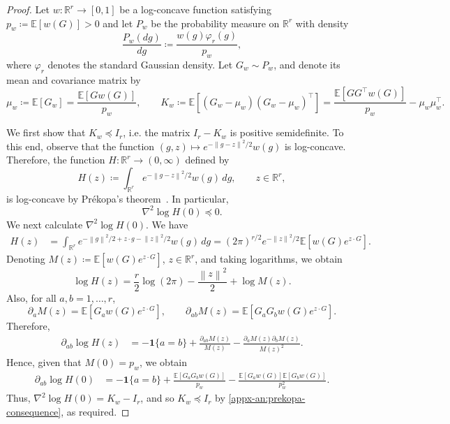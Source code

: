 \documentclass[11pt,letterpaper]{article}
\theoremstyle{remark}
\newcommand{\E}{\mathbb E}
\newcommand{\R}{\mathbb R}
\newcommand{\norm}[1]{\left\lVert#1\right\rVert}
\newcommand{\dd}{\,d}
\begin{document}
\begin{proof}

Let \(w:\R^r\to[0,1]\) be a log-concave function
satisfying \(p_w\coloneqq\E[w(G)]>0\) and let
\(P_w\) be the probability measure on \(\R^r\) with density
\[
\frac{P_w(dg)}{dg}
\coloneqq\frac{w(g)\varphi_r(g)}{p_w},
\]
where \(\varphi_r\) denotes the standard Gaussian density.
Let \(G_w\sim P_w\), and denote its mean and covariance
matrix by
\[
\mu_w\coloneqq\E[G_w]=\frac{\E[Gw(G)]}{p_w},\qquad
K_w\coloneqq\E[(G_w-\mu_w)(G_w-\mu_w)^\top]=\frac{\E[GG^\top w(G)]}{p_w}-\mu_w\mu_w^\top.
\]

We first show that \(K_w\preceq I_r\), i.e. the matrix $I_r - K_w$ is positive semidefinite. To this end, observe that the function $(g, z)\mapsto e^{-\norm{g-z}^2/2}w(g)$
is log-concave. Therefore, the function \(H:\R^r\to(0,\infty)\) defined by
\[
H(z)\coloneqq
\int_{\R^r}e^{-\norm{g-z}^2/2}w(g)\dd g,\qquad z\in\R^r,
\]
is log-concave by Pr\'ekopa's theorem~\cite[Theorem~6]{Prekopa1973}.
In particular,
\begin{equation}\label{appx-an:prekopa-consequence}
\nabla^2\log H(0)\preceq0.
\end{equation}
We next calculate $\nabla^2\log H(0)$.
We have
\begin{align*}
H(z)
&=\int_{\R^r}
 e^{-\norm g^2/2+z\cdot g-\norm z^2/2}
 w(g)\dd g
 =(2\pi)^{r/2}e^{-\norm z^2/2}
 \E[w(G)e^{z\cdot G}].
\end{align*}
Denoting \(M(z)\coloneqq\E[w(G)e^{z\cdot G}]\), $z\in\R^r$, and taking logarithms, we obtain
\[
\log H(z)
=\frac r2\log(2\pi)-\frac{\norm z^2}{2}
 +\log M(z).
\]
Also, for all \(a, b = 1,\dots, r\),
\[
\partial_a M(z)
=\E[G_aw(G)e^{z\cdot G}],
\qquad
\partial_{ab}M(z)
=\E[G_aG_bw(G)e^{z\cdot G}].
\]
Therefore,
\begin{align*}
\partial_{ab}\log H(z)
&=-\mathbf 1\{a=b\}
 +\frac{\partial_{ab}M(z)}{M(z)}
 -\frac{\partial_aM(z)\partial_bM(z)}{M(z)^2}.
\end{align*}
Hence, given that \(M(0)=p_w\), we obtain
\begin{align*}
\partial_{ab}\log H(0)
&=-\mathbf 1\{a=b\}
 +\frac{\E[G_aG_bw(G)]}{p_w}
  -\frac{\E[G_aw(G)]\E[G_bw(G)]}{p_w^2}.
\end{align*}
Thus, $\nabla^2\log H(0)=K_w-I_r$, and so $K_w\preceq I_r$ by \eqref{appx-an:prekopa-consequence}, as required.


\end{proof}
\end{document}
